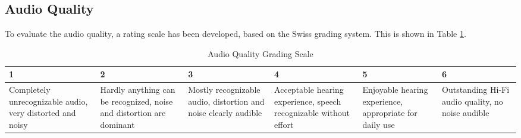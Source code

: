 \subsection{Audio Quality}
To evaluate the audio quality, a rating scale has been developed, based on the Swiss grading system. This is shown in Table \ref{6.1.2_tab:audio_quality}.
\begin{center}
\begin{table}[h!]
\centering
\begin{tabular}{ |m{2.1cm}|m{2.1cm}|m{2.1cm}|m{2.1cm}|m{2.1cm}|m{2.1cm}|}
  \hline 
  1 & 2 & 3 & 4 & 5 & 6\\ 
  \hline
 Completely unrecognizable audio, very distorted and noisy & Hardly anything can be recognized, noise and distortion are dominant & Mostly recognizable audio, distortion and noise clearly audible &  Acceptable hearing experience, speech recognizable without effort & Enjoyable hearing experience, appropriate for daily use &  Outstanding Hi-Fi audio quality, no noise audible \\
 \hline
\end{tabular}
\caption{Audio Quality Grading Scale}
\label{6.1.2_tab:audio_quality}
\end{table}
\end{center}


